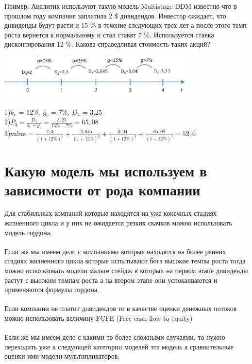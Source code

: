 \documentclass{article}
\begin{document}
Пример: Аналитик используют такую модель Multistage DDM известно что в прошлом году компания заплатила 2 \$ дивидендов. Инвестор ожидает, что дивиденды будут расти и 15 \% в течение следующих трех лет а после этого темп роста вернется к нормальному и стал ставят 7 \%. Используется ставка дисконтирования 12 \%. Какова справедливая стоимость таких акций?\\
\begin{center}
\includegraphics[width=0.75\textwidth]{multistage_ddm.png}\\
\end{center}
1)$k_e$ = 12\%, $g_c$ = 7\%, $D_4$ = 3,25\\
2)$P_3 = \frac{D_4}{k_e - g_c} = \frac{3,25}{15\% - 7\%} = 65,08$\\
3)value = $\frac{2,3}{(1+12\%)^1} + \frac{2,645}{(1+12\%)^2} + \frac{3,04}{(1+12\%)^3} + \frac{65,08}{(1+12\%)^4} = 52,6$\\
\section{Какую модель мы используем в зависимости от рода компании}
Для стабильных компаний которые находятся на уже конечных стадиях жизненного цикла и у них не ожидается резких скачков можно использовать модель гордона.\\
\\
Если же мы имеем дело с компаниями которые находятся на более ранних стадиях жизненного цикла которые испытывают бога высокие темпы роста тогда можно использовать модели мальте стейдж в которых на первом этапе дивиденды растут с высоким темпам роста а на втором этапе они успокаиваются и применяются формулы гордона.\\
\\
Если компании не платит дивидендов то в качестве оценки денежных потоков можно использовать величину FCFE (Free cash flow to equity)\\
\\
Если же мы имеем дело с какими-то более сложными случаями, то нужно переходить уже к следующей категории моделей эта модель а сравнительные оценки ими модели мультипликаторов.\\
\end{document}
